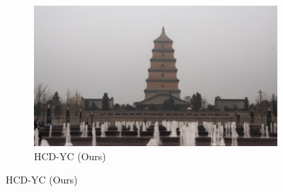 \documentclass{article}
\begin{document}
\begin{figure}[t]
\begin{subfigure}[b]{0.32\textwidth}
    \centering
    \includegraphics[width=\textwidth]{examples_ours/4_isr_adaptive.png}
    \caption{HCD-YC (Ours)}
\end{subfigure}


\end{figure}
\end{document}

